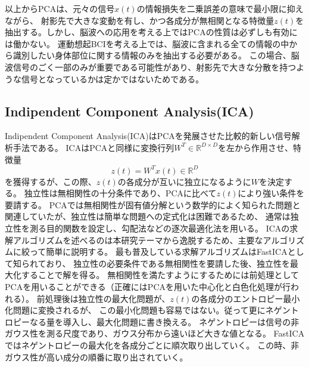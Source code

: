 以上からPCAは、元々の信号\(x(t)\)の情報損失を二乗誤差の意味で最小限に抑えながら、
射影先で大きな変動を有し、かつ各成分が無相関となる特徴量\(z(t)\)を抽出する。しかし、脳波への応用を考える上ではPCAの性質は必ずしも有効には働かない。
運動想起BCIを考える上では、脳波に含まれる全ての情報の中から識別したい身体部位に関する情報のみを抽出する必要がある。
この場合、脳波信号のごく一部のみが重要である可能性があり、射影先で大きな分散を持つような信号となっているかは定かではないためである。




\subsection{\rm Indipendent Component Analysis(ICA)}
Indipendent Component Analysis(ICA)はPCAを発展させた比較的新しい信号解析手法である。
ICAはPCAと同様に変換行列\(W^T \in \mathbb R^{D \times D}\)を左から作用させ、特徴量
\begin{equation}
    z(t)=W^Tx(t) \in \mathbb R^D
\end{equation}
を獲得するが、この際、\(z(t)\)の各成分が互いに独立になるように\(W\)を決定する。
独立性は無相関性の十分条件であり、PCAに比べて\(z(t)\)により強い条件を要請する。
PCAでは無相関性が固有値分解という数学的によく知られた問題と関連していたが、独立性は簡単な問題への定式化は困難であるため、
通常は独立性を測る目的関数を設定し、勾配法などの逐次最適化法を用いる。
ICAの求解アルゴリズムを述べるのは本研究テーマから逸脱するため、主要なアルゴリズムに絞って簡単に説明する。
最も普及している求解アルゴリズムはFastICAとして知られており、
独立性の必要条件である無相関性を要請した後、独立性を最大化することで解を得る。
無相関性を満たすようにするためには前処理としてPCAを用いることができる（正確にはPCAを用いた中心化と白色化処理が行われる）。
前処理後は独立性の最大化問題が、\(z(t)\)の各成分のエントロピー最小化問題に変換されるが、
この最小化問題も容易ではない。従って更にネゲントロピーなる量を導入し、最大化問題に書き換える。
ネゲントロピーは信号の非ガウス性を測る尺度であり、ガウス分布から遠いほど大きな値となる。
FastICAではネゲントロピーの最大化を各成分ごとに順次取り出していく。
この時、非ガウス性が高い成分の順番に取り出されていく\cite{ICA1}。

